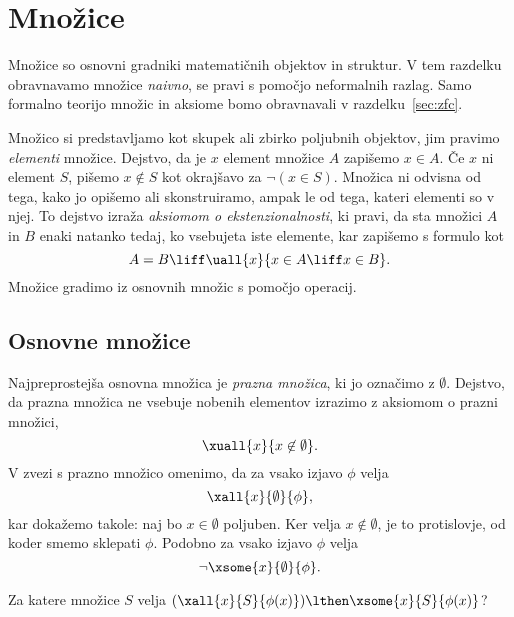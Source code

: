 \section{Množice}
\label{sec:naivne-mnozice}

Množice so osnovni gradniki matematičnih objektov in struktur. V tem razdelku obravnavamo množice \emph{naivno}, se pravi s pomočjo neformalnih razlag. Samo formalno teorijo množic in aksiome bomo obravnavali v razdelku~\ref{sec:zfc}.

Množico si predstavljamo kot skupek ali zbirko poljubnih objektov, jim pravimo \emph{elementi} množice. Dejstvo, da je $x$ element množice $A$ zapišemo $x \in A$. Če $x$ ni element $S$, pišemo $x \not\in S$ kot okrajšavo za $\lnot (x \in S)$. Množica ni odvisna od tega, kako jo opišemo ali skonstruiramo, ampak le od tega, kateri elementi so v njej. To dejstvo izraža \emph{aksiomom o ekstenzionalnosti}, ki pravi, da sta množici $A$ in $B$ enaki natanko tedaj, ko vsebujeta iste elemente, kar zapišemo s formulo kot
%
\begin{equation*}
  A = B \liff \uall{x}{x \in A \liff x \in B}.
\end{equation*}
%
Množice gradimo iz osnovnih množic s pomočjo operacij.

\subsection{Osnovne množice}
\label{sec:osnovne-mnozice}

Najpreprostejša osnovna množica je \emph{prazna množica}, ki jo označimo z $\emptyset$. Dejstvo, da prazna množica ne vsebuje nobenih elementov izrazimo z aksiomom o prazni množici,
%
\begin{equation*}
  \xuall{x}{x \not\in \emptyset}.
\end{equation*}
%
V zvezi s prazno množico omenimo, da za vsako izjavo $\phi$ velja
%
\begin{equation*}
  \xall{x}{\emptyset}{\phi},
\end{equation*}
%
kar dokažemo takole: naj bo $x \in \emptyset$ poljuben. Ker velja $x \not\in \emptyset$, je to protislovje, od koder smemo sklepati $\phi$. Podobno za vsako izjavo $\phi$ velja
%
\begin{equation*}
  \lnot\xsome{x}{\emptyset}{\phi}.
\end{equation*}

\begin{naloga}
  Za katere množice $S$ velja $(\xall{x}{S}{\phi(x)}) \lthen   \xsome{x}{S}{\phi(x)}$?
\end{naloga}

